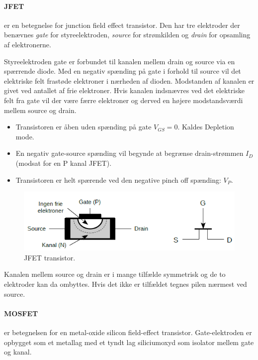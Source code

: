 \documentclass[danish]{article}
\begin{document}
\paragraph{JFET} er en betegnelse for junction field effect transistor. 
Den har tre elektroder der benævnes \textit{gate} for styreelektroden, \textit{source} for strømkilden og \textit{drain} for opsamling af
elektronerne. 

Styreelektroden gate er forbundet til kanalen mellem drain og source via en spærrende diode. 
Med en negativ spænding på gate i forhold til source vil det elektriske felt frastøde elektroner i nærheden af dioden. 
Modstanden af kanalen er givet ved antallet af frie elektroner.
Hvis kanalen indsnævres ved det elektriske felt fra gate vil der være færre elektroner og derved en højere modstandsværdi mellem source og drain.

\begin{itemize}
	\item Transistoren er åben uden spænding på gate $V_{GS}=0$. Kaldes Depletion mode.
	\item En negativ gate-source spænding vil begynde at begrænse drain-strømmen $I_D$ \newline (modsat for en P kanal JFET).
	\item Transistoren er helt spærende ved den negative pinch off spænding: $V_P$.
\end{itemize}

\begin{figure} [H]
	\centering
	\includegraphics[width=0.8\linewidth]{graphics/jfet}
	\caption{JFET transistor.}
	\label{fig:jfet}
\end{figure}

Kanalen mellem source og drain er i mange tilfælde symmetrisk og de to elektroder kan da ombyttes. Hvis det ikke er tilfældet tegnes pilen nærmest ved source.


\paragraph{MOSFET} er betegnelsen for en metal-oxide silicon field-effect transistor. 
Gate-elektroden er opbygget som et metallag med et tyndt lag siliciumoxyd som isolator mellem gate og kanal.
\end{document}
